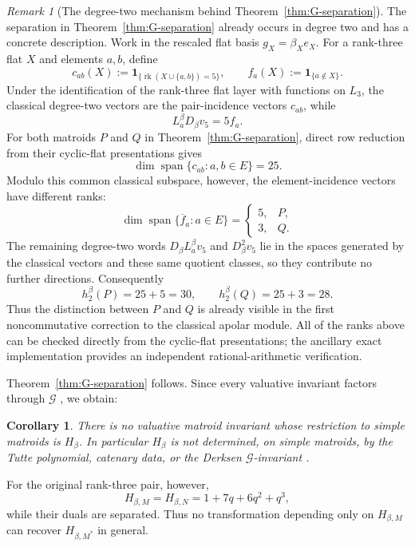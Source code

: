 \documentclass[11pt]{amsart}
\newtheorem{cor}[thm]{Corollary}
\theoremstyle{definition}
\theoremstyle{remark}
\newtheorem{remark}[thm]{Remark}
\DeclareMathOperator{\rk}{rk}
\DeclareMathOperator{\Span}{span}
\begin{document}
\begin{remark}[The degree-two mechanism behind Theorem~\ref{thm:G-separation}]
The separation in Theorem~\ref{thm:G-separation} already occurs in degree two
and has a concrete description.  Work in the rescaled flat basis
$g_X=\beta_Xe_X$.  For a rank-three flat $X$ and elements $a,b$, define
\[
c_{ab}(X):=
\mathbf 1_{\{\rk(X\cup\{a,b\})=5\}},
\qquad
f_a(X):=\mathbf 1_{\{a\notin X\}}.
\]
Under the identification of the rank-three flat layer with functions on
$L_3$, the classical degree-two vectors are the pair-incidence vectors
$c_{ab}$, while
\[
L_a^\beta D_\beta v_5=5f_a.
\]
For both matroids $P$ and $Q$ in Theorem~\ref{thm:G-separation}, direct
row reduction from their cyclic-flat presentations gives
\[
\dim\Span\{c_{ab}:a,b\in E\}=25.
\]
Modulo this common classical subspace, however, the element-incidence
vectors have different ranks:
\[
\dim\Span\{\overline f_a:a\in E\}
=
\begin{cases}
5,&P,\\
3,&Q.
\end{cases}
\]
The remaining degree-two words $D_\beta L_a^\beta v_5$ and
$D_\beta^2v_5$ lie in the spaces generated by the classical vectors and
these same quotient classes, so they contribute no further directions.
Consequently
\[
h_2^\beta(P)=25+5=30,
\qquad
h_2^\beta(Q)=25+3=28.
\]
Thus the distinction between $P$ and $Q$ is already visible in the
first noncommutative correction to the classical apolar module.  All of
the ranks above can be checked directly from the cyclic-flat
presentations; the ancillary exact implementation provides an
independent rational-arithmetic verification.
\end{remark}


Theorem~\ref{thm:G-separation} follows.  Since every valuative invariant factors through $\mathcal G$ \cite{DerksenFink}, we obtain:

\begin{cor}\label{cor:nonvaluative}
There is no valuative matroid invariant whose restriction to simple matroids is $H_\beta$.  In particular $H_\beta$ is not determined, on simple matroids, by the Tutte polynomial, catenary data, or the Derksen $\mathcal G$-invariant \cite{BoninKung}.
\end{cor}

For the original rank-three pair, however,
\[
H_{\beta,M}=H_{\beta,N}=1+7q+6q^2+q^3,
\]
while their duals are separated.  Thus no transformation depending only on $H_{\beta,M}$ can recover $H_{\beta,M^*}$ in general.
\end{document}
